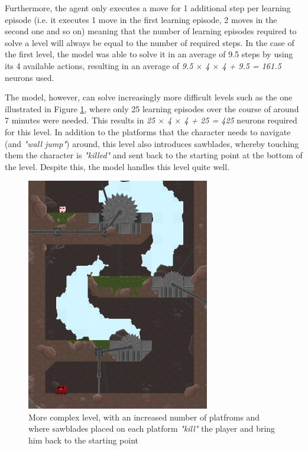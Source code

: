 \documentclass[10pt]{article}
\begin{document}
    Furthermore, the agent only executes a move for 1 additional step per learning episode (i.e. it executes 1 move in the first learning episode, 2 moves in the second one and so on) meaning that the number of learning episodes required to solve a level will always be equal to the number of required steps. In the case of the first level, the model was able to solve it in an average of 9.5 steps by using its 4 available actions, resulting in an average of \textit{9.5 $\times$ 4 $\times$ 4 + 9.5 = 161.5} neurons used.

    The model, however, can solve increasingly more difficult levels such as the one illustrated in Figure \ref{fig:complexLevel}, where only 25 learning episodes over the course of around 7 minutes were needed. This results in \textit{25 $\times$ 4 $\times$ 4 + 25 = 425} neurons required for this level. In addition to the platforms that the character needs to navigate (and \textit{"wall jump"}) around, this level also introduces sawblades, whereby touching them the character is \textit{"killed"} and sent back to the starting point at the bottom of the level. Despite this, the model handles this level quite well.

    \begin{figure}[ht!]
    \centering
    \includegraphics[width=80mm]{./bladeLevelLong.png}
    \caption{More complex level, with an increased number of platfroms and where sawblades placed on each platform \textit{"kill"} the player and bring him back to the starting point}
    \label{fig:complexLevel}
    \end{figure}
\end{document}
